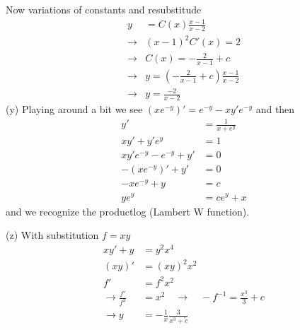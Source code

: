 \documentclass[../main.tex]{subfiles}
\begin{document}
Now variations of constants and resubstitude
\begin{align}
y&=C(x)\frac{x-1}{x-2}\\
\rightarrow&(x-1)^2C'(x)=2\\
\rightarrow&C(x)=-\frac{2}{x-1}+c\\
\rightarrow&y=\left(-\frac{2}{x-1}+c\right)\frac{x-1}{x-2}\\
\rightarrow&y=\frac{-2}{x-2}
\end{align}
(y) Playing around a bit we see $(xe^{-y})'=e^{-y}-xy'e^{-y}$ and then
\begin{align}
y'&=\frac{1}{x+e^y}\\
xy'+y'e^y&=1\\
xy'e^{-y}-e^{-y}+y'&=0\\
-(xe^{-y})'+y'&=0\\
-xe^{-y}+y&=c\\
ye^y&=ce^y+x
\end{align}
and we recognize the productlog (Lambert W function).

(z) With substitution $f=xy$
\begin{align}
xy'+y&=y^2x^4\\
(xy)'&=(xy)^2x^2\\
f'&=f^2x^2\\
\rightarrow\frac{f'}{f^2}&=x^2\quad\rightarrow\quad-f^{-1}=\frac{x^3}{3}+c\\
\rightarrow y&=-\frac{1}{x}\frac{3}{x^3+\tilde{c}}
\end{align}
\end{document}

